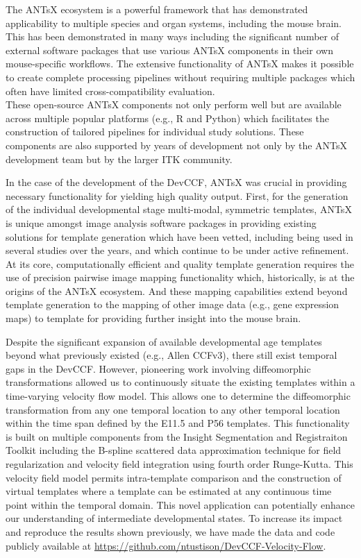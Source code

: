 \documentclass[
  12pt,
]{article}
\begin{document}
The ANTsX ecosystem is a powerful framework that has demonstrated\\
applicability to multiple species and organ systems, including the mouse
brain.\\
This has been demonstrated in many ways including the significant number
of external software packages that use various ANTsX components in their
own mouse-specific workflows. The extensive functionality of ANTsX makes
it possible to create complete processing pipelines without requiring
multiple packages which often have limited cross-compatibility
evaluation.\\
These open-source ANTsX components not only perform well but are
available across multiple popular platforms (e.g., R and Python) which
facilitates the construction of tailored pipelines for individual study
solutions. These components are also supported by years of development
not only by the ANTsX development team but by the larger ITK community.

In the case of the development of the DevCCF, ANTsX was crucial in
providing necessary functionality for yielding high quality output.
First, for the generation of the individual developmental stage
multi-modal, symmetric templates, ANTsX is unique amongst image analysis
software packages in providing existing solutions for template
generation which have been vetted, including being used in several
studies over the years, and which continue to be under active
refinement. At its core, computationally efficient and quality template
generation requires the use of precision pairwise image mapping
functionality which, historically, is at the origins of the ANTsX
ecosystem. And these mapping capabilities extend beyond template
generation to the mapping of other image data (e.g., gene expression
maps) to template for providing further insight into the mouse brain.

Despite the significant expansion of available developmental age
templates beyond what previously existed (e.g., Allen CCFv3), there
still exist temporal gaps in the DevCCF. However, pioneering work
involving diffeomorphic transformations allowed us to continuously
situate the existing templates within a time-varying velocity flow
model. This allows one to determine the diffeomorphic transformation
from any one temporal location to any other temporal location within the
time span defined by the E11.5 and P56 templates. This functionality is
built on multiple components from the Insight Segmentation and
Registraiton Toolkit including the B-spline scattered data approximation
technique for field regularization and velocity field integration using
fourth order Runge-Kutta. This velocity field model permits
intra-template comparison and the construction of virtual templates
where a template can be estimated at any continuous time point within
the temporal domain. This novel application can potentially enhance our
understanding of intermediate developmental states. To increase its
impact and reproduce the results shown previously, we have made the data
and code publicly available at
\url{https://github.com/ntustison/DevCCF-Velocity-Flow}.
\end{document}
